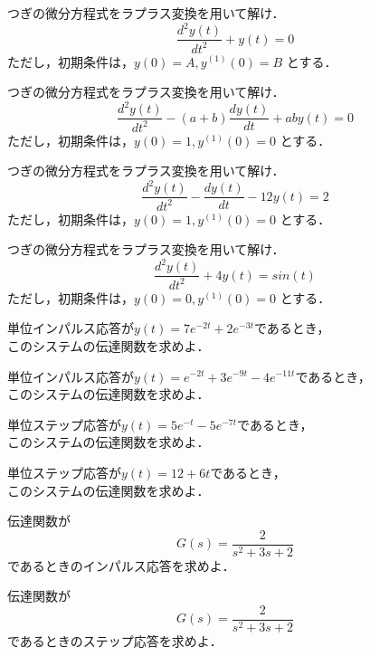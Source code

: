 \documentclass[a4paper,12pt]{article}
\begin{document}
\noindent
[17] つぎの微分方程式をラプラス変換を用いて解け．\\
\[
\frac{d^2y(t)}{dt^2} + y(t) = 0
\]
\quad ただし，初期条件は，\(y(0)=A, y^{(1)}(0)=B\) とする．
\vspace{10mm}


\noindent
[18] つぎの微分方程式をラプラス変換を用いて解け．\\
\[
\frac{d^2y(t)}{dt^2} -( a + b )\frac{dy(t)}{dt} + a b y(t) = 0
\]
\quad ただし，初期条件は，\(y(0)=1, y^{(1)}(0)=0\) とする．
\vspace{10mm}


\noindent
[19] つぎの微分方程式をラプラス変換を用いて解け．\\
\[
\frac{d^2y(t)}{dt^2} - \frac{dy(t)}{dt} - 12 y(t) = 2
\]
\quad ただし，初期条件は，\(y(0)=1, y^{(1)}(0)=0\) とする．
\vspace{10mm}


\noindent
[20] つぎの微分方程式をラプラス変換を用いて解け．\\
\[
\frac{d^2y(t)}{dt^2} + 4 y(t) = sin(t)
\]
\quad ただし，初期条件は，\(y(0)=0, y^{(1)}(0)=0\) とする．
\vspace{10mm}


\noindent
[21] 単位インパルス応答が\(y(t)=7e^{-2t}+2e^{-3t}\)であるとき，\\ 
\qquad このシステムの伝達関数を求めよ．
\vspace{10mm}


\noindent
[22] 単位インパルス応答が\(y(t)=e^{-2t}+3e^{-9t}-4e^{-11t}\)であるとき，\\
\qquad このシステムの伝達関数を求めよ．
\vspace{10mm}


\noindent
[23] 単位ステップ応答が\(y(t)=5e^{-t}-5e^{-7t}\)であるとき，\\
\qquad このシステムの伝達関数を求めよ．
\vspace{10mm}


\noindent
[24] 単位ステップ応答が\(y(t)=12+6t\)であるとき，\\
\qquad このシステムの伝達関数を求めよ．
\vspace{10mm}


\noindent
[25] 伝達関数が
\[G(s)=\frac{2}{s^2+3s+2}\]
\qquad であるときのインパルス応答を求めよ．
\vspace{10mm}


\noindent
[26] 伝達関数が
\[G(s)=\frac{2}{s^2+3s+2}\]
\qquad であるときのステップ応答を求めよ．
\vspace{10mm}
\end{document}
